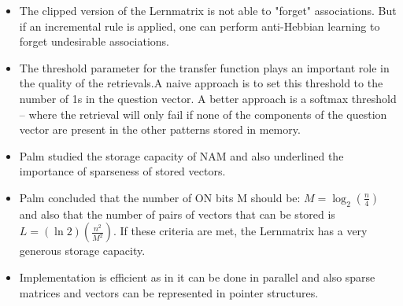 \documentclass{article}
\begin{document}
\begin{itemize}
\item The clipped version of the Lernmatrix is not able to "forget" associations. But if an incremental rule is applied, one can perform anti-Hebbian learning to forget undesirable associations.
\item The threshold parameter for the transfer function plays an important role in the quality of the retrievals.A naive approach is to set this threshold to the number of 1s in the question vector. A better approach is a softmax threshold -- where the retrieval will only fail if none of the components of the question vector are present in the other patterns stored in memory.
\item Palm studied the storage capacity of NAM and also underlined the importance of sparseness of stored vectors. 
\item Palm concluded that the number of ON bits M should be: $M=\log _{2}\left(\frac{n}{4}\right)$ and also that the number of pairs of vectors that can be stored is $L=(\ln 2)\left(\frac{n^{2}}{M^{2}}\right)$. If these criteria are met, the Lernmatrix has a very generous storage capacity.
\item Implementation is efficient as in it can be done in parallel and also sparse matrices and vectors can be represented in pointer structures.
\end{itemize}
\end{document}
